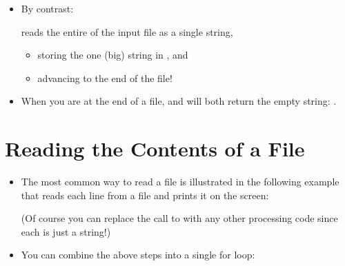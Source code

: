 \documentclass[letterpaper,10pt,english]{sphinxmanual}
\begin{document}
\begin{itemize}
\item {} 
By contrast:

\begin{sphinxVerbatim}[commandchars=\\\{\}]
  
\end{sphinxVerbatim}

reads the entire  of the input file as a single string,
\begin{itemize}
\item {} 
storing the one (big) string in , and

\item {} 
advancing  to the end of the file!

\end{itemize}

\item {} 
When you are at the end of a file,  and  will
both return the empty string: .

\end{itemize}


\section{Reading the Contents of a File}
\label{\detokenize{lecture_notes/lec13_files_web:reading-the-contents-of-a-file}}\begin{itemize}
\item {} 
The most common way to read a file is illustrated in the following
example that reads each line from a file and prints it on the screen:

\begin{sphinxVerbatim}[commandchars=\\\{\}]
  
   
\end{sphinxVerbatim}

(Of course you can replace the call to  with any other
processing code since each  is just a string!)

\item {} 
You can combine the above steps into a single for loop:

\begin{sphinxVerbatim}[commandchars=\\\{\}]
   
\end{sphinxVerbatim}

\end{itemize}
\end{document}
